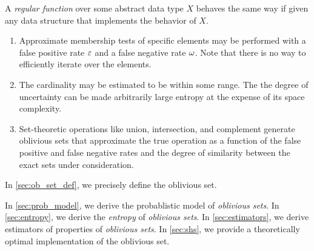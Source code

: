 \documentclass[ ../main.tex]{subfiles}
\begin{document}
A \emph{regular function} over some abstract data type $X$ behaves the same way 
if given any data structure that implements the behavior of $X$. 

\begin{enumerate}
    \item Approximate membership tests of specific elements may be performed with a false positive rate $\varepsilon$ and a false negative rate $\omega$. Note that there is no way to efficiently iterate over the elements.
    
    \item The cardinality may be estimated to be within some range. The the degree of uncertainty can be made arbitrarily large entropy at the expense of its space complexity.
        
    \item Set-theoretic operations like union, intersection, and complement generate oblivious sets that approximate the true operation as a function of the false positive and false negative rates and the degree of similarity between the exact sets under consideration.
\end{enumerate}

In \cref{sec:ob_set_def}, we precisely define the oblivious set.


In \cref{sec:prob_model}, we derive the probablistic model of \emph{oblivious sets}. In \cref{sec:entropy}, we derive the \emph{entropy} of \emph{oblivious sets}. In \cref{sec:estimators}, we derive estimators of properties of \emph{oblivious sets}. In \cref{sec:shs}, we provide a theoretically optimal implementation of the oblivious set.
\end{document}
